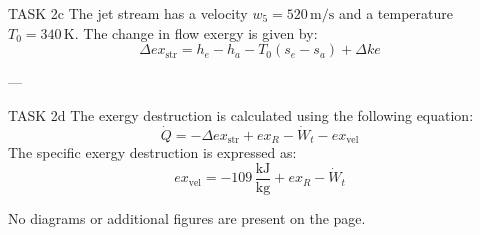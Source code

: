 TASK 2c  
The jet stream has a velocity \( w_5 = 520 \, \text{m/s} \) and a temperature \( T_0 = 340 \, \text{K} \).  
The change in flow exergy is given by:  
\[
\Delta ex_{\text{str}} = h_e - h_a - T_0 (s_e - s_a) + \Delta ke
\]

---

TASK 2d  
The exergy destruction is calculated using the following equation:  
\[
\dot{Q} = -\Delta ex_{\text{str}} + ex_{R} - \dot{W}_t - ex_{\text{vel}}
\]  
The specific exergy destruction is expressed as:  
\[
ex_{\text{vel}} = -109 \, \frac{\text{kJ}}{\text{kg}} + ex_{R} - \dot{W}_t
\]  

No diagrams or additional figures are present on the page.